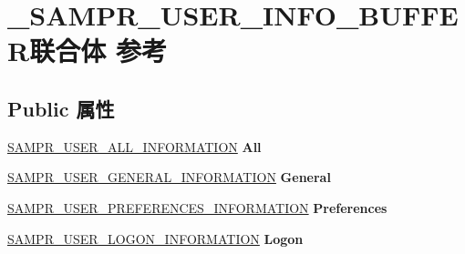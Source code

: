 \hypertarget{union___s_a_m_p_r___u_s_e_r___i_n_f_o___b_u_f_f_e_r}{}\section{\+\_\+\+S\+A\+M\+P\+R\+\_\+\+U\+S\+E\+R\+\_\+\+I\+N\+F\+O\+\_\+\+B\+U\+F\+F\+E\+R联合体 参考}
\label{union___s_a_m_p_r___u_s_e_r___i_n_f_o___b_u_f_f_e_r}
\subsection*{Public 属性}
\begin{DoxyCompactItemize}
\item 
\mbox{\label{union___s_a_m_p_r___u_s_e_r___i_n_f_o___b_u_f_f_e_r_aa0e5a8c6094fb13b7b9c2942665aa487}} 
\hyperlink{struct___s_a_m_p_r___u_s_e_r___a_l_l___i_n_f_o_r_m_a_t_i_o_n}{S\+A\+M\+P\+R\+\_\+\+U\+S\+E\+R\+\_\+\+A\+L\+L\+\_\+\+I\+N\+F\+O\+R\+M\+A\+T\+I\+ON} {\bfseries All}
\item 
\mbox{\label{union___s_a_m_p_r___u_s_e_r___i_n_f_o___b_u_f_f_e_r_a5505abb3ce3e1dc4d60043673e2d3788}} 
\hyperlink{struct___s_a_m_p_r___u_s_e_r___g_e_n_e_r_a_l___i_n_f_o_r_m_a_t_i_o_n}{S\+A\+M\+P\+R\+\_\+\+U\+S\+E\+R\+\_\+\+G\+E\+N\+E\+R\+A\+L\+\_\+\+I\+N\+F\+O\+R\+M\+A\+T\+I\+ON} {\bfseries General}
\item 
\mbox{\label{union___s_a_m_p_r___u_s_e_r___i_n_f_o___b_u_f_f_e_r_ad0466ef33e1cd6ae2880cc820adc0ea6}} 
\hyperlink{struct___s_a_m_p_r___u_s_e_r___p_r_e_f_e_r_e_n_c_e_s___i_n_f_o_r_m_a_t_i_o_n}{S\+A\+M\+P\+R\+\_\+\+U\+S\+E\+R\+\_\+\+P\+R\+E\+F\+E\+R\+E\+N\+C\+E\+S\+\_\+\+I\+N\+F\+O\+R\+M\+A\+T\+I\+ON} {\bfseries Preferences}
\item 
\mbox{\label{union___s_a_m_p_r___u_s_e_r___i_n_f_o___b_u_f_f_e_r_aa06752be1e63e525116fa8835c03eade}} 
\hyperlink{struct___s_a_m_p_r___u_s_e_r___l_o_g_o_n___i_n_f_o_r_m_a_t_i_o_n}{S\+A\+M\+P\+R\+\_\+\+U\+S\+E\+R\+\_\+\+L\+O\+G\+O\+N\+\_\+\+I\+N\+F\+O\+R\+M\+A\+T\+I\+ON} {\bfseries Logon}
\item 

\end{DoxyCompactItemize}
